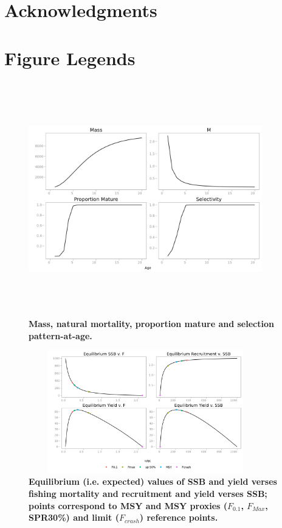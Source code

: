 \documentclass[10pt]{article}
\begin{document}
\section*{Acknowledgments}


\newpage
 

%

\section*{Figure Legends}

\begin{figure}[!ht]
\begin{center}
\includegraphics[height=4in, width=4in]{fig1.png}
\end{center}
\caption{\bf{Mass, natural mortality, proportion mature and selection pattern-at-age.}}
\label{fig:stock}
\end{figure}

\begin{figure}[!ht]
\begin{center}
\includegraphics[height=2.1in, width=4in]{fig2.png}
\end{center}
\caption{\bf{Equilibrium (i.e. expected) values of SSB and yield verses fishing mortality and recruitment and yield verses SSB; points correspond to
MSY and MSY proxies ($F_{0.1}$, $F_{Max}$, SPR30\%) and limit ($F_{crash}$) reference points.}}
\label{fig:brp}
\end{figure}
\end{document}
